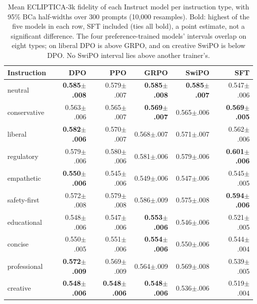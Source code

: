 \documentclass[letterpaper]{article} %
\begin{document}
\begin{table}[t]
\centering
\small
\setlength{\tabcolsep}{6pt}
\begin{tabular}{lrrrrr}
\toprule
Instruction & DPO & PPO & GRPO & SwiPO & SFT \\
\midrule
neutral & \textbf{0.585{\tiny$\pm$.008}} & 0.579{\tiny$\pm$.007} & \textbf{0.585{\tiny$\pm$.008}} & \textbf{0.585{\tiny$\pm$.007}} & 0.547{\tiny$\pm$.006} \\
conservative & 0.563{\tiny$\pm$.006} & 0.565{\tiny$\pm$.007} & \textbf{0.569{\tiny$\pm$.007}} & 0.565{\tiny$\pm$.006} & \textbf{0.569{\tiny$\pm$.005}} \\
liberal & \textbf{0.582{\tiny$\pm$.006}} & 0.570{\tiny$\pm$.007} & 0.568{\tiny$\pm$.007} & 0.571{\tiny$\pm$.007} & 0.562{\tiny$\pm$.006} \\
regulatory & 0.579{\tiny$\pm$.006} & 0.580{\tiny$\pm$.006} & 0.581{\tiny$\pm$.006} & 0.579{\tiny$\pm$.006} & \textbf{0.601{\tiny$\pm$.006}} \\
empathetic & \textbf{0.550{\tiny$\pm$.006}} & 0.545{\tiny$\pm$.006} & 0.549{\tiny$\pm$.006} & 0.547{\tiny$\pm$.006} & 0.545{\tiny$\pm$.005} \\
safety-first & 0.572{\tiny$\pm$.008} & 0.579{\tiny$\pm$.008} & 0.586{\tiny$\pm$.009} & 0.575{\tiny$\pm$.008} & \textbf{0.594{\tiny$\pm$.006}} \\
educational & 0.548{\tiny$\pm$.006} & 0.547{\tiny$\pm$.006} & \textbf{0.553{\tiny$\pm$.006}} & 0.546{\tiny$\pm$.006} & 0.521{\tiny$\pm$.005} \\
concise & 0.550{\tiny$\pm$.005} & 0.551{\tiny$\pm$.006} & \textbf{0.554{\tiny$\pm$.006}} & 0.550{\tiny$\pm$.006} & 0.544{\tiny$\pm$.004} \\
professional & \textbf{0.572{\tiny$\pm$.009}} & 0.569{\tiny$\pm$.009} & 0.564{\tiny$\pm$.009} & 0.569{\tiny$\pm$.008} & 0.539{\tiny$\pm$.005} \\
creative & \textbf{0.548{\tiny$\pm$.006}} & \textbf{0.548{\tiny$\pm$.006}} & \textbf{0.548{\tiny$\pm$.006}} & 0.536{\tiny$\pm$.006} & 0.519{\tiny$\pm$.004} \\
\bottomrule
\end{tabular}
\caption{Mean ECLIPTICA-3k fidelity of each Instruct model per instruction type, with 95\% BCa half-widths over 300 prompts (10,000 resamples). Bold: highest of the five models in each row, SFT included (ties all bold), a point estimate, not a significant difference. The four preference-trained models' intervals overlap on eight types; on liberal DPO is above GRPO, and on creative SwiPO is below DPO. No SwiPO interval lies above another trainer's.}
\label{tab:perinstr}
\end{table}
\end{document}
